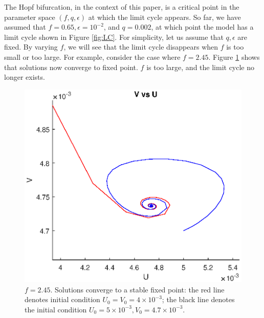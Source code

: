 \documentclass[twocolumn,amsmath,amssymb,aps]{revtex4}
\begin{document}
The Hopf bifurcation, in the context of this paper, is a critical point in the parameter space $(f,q,\epsilon)$ at which the limit cycle appears. So far, we have assumed that $f = 0.65, \epsilon = 10^{-2}$, and $q = 0.002$, at which point the model has a limit cycle shown in Figure \ref{fig:LC}. For simplicity, let us assume that $q,\epsilon$ are fixed. By varying $f$, we will see that the limit cycle disappears when $f$ is too small or too large. For example, consider the case where $f=2.45$. Figure \ref{fig:hopf1} shows that solutions now converge to fixed point. $f$ is too large, and the limit cycle no longer exists.
\begin{figure}[!htb]
	\centering
	\includegraphics[scale=0.6]{hopf1.eps}
	\caption{$f = 2.45$. Solutions converge to a stable fixed point: the red line denotes initial condition $U_0 =V_0 = 4\times 10^{-3}$; the black line denotes the initial condition $U_0 = 5\times 10^{-3}, V_0 = 4.7 \times 10^{-3}$.}
	\label{fig:hopf1}
\end{figure}
\end{document}
